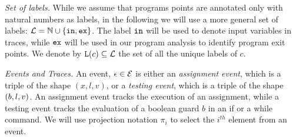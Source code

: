 %

\noindent\emph{Set of labels.} While we assume that programs points are annotated only with natural numbers as labels, in the following we will use a more general set of labels: $\mathcal{L} = \mathbb{N}\cup\{\mathtt{in},\mathtt{ex}\}$. The label $\mathtt{in}$ will be used to denote input variables in traces, while $\mathtt{ex}$ will be used in our program analysis to identify program exit points.
We denote by  $\mathtt{L}(c) \subseteq \mathcal{L}$ the set of all the unique labels of $c$.





\noindent\emph{Events and Traces.} 
An event, $\mathtt{\epsilon} \in \mathcal{E}$ is either an \emph{assignment event}, which is  a triple of the shape $({x}, l,v)$, or a \emph{testing event}, which is a triple of the shape $(b, l, v)$. An assignment event tracks the execution of an assignment, while a testing event tracks the evaluation
of a boolean guard $b$ in an if or a while command.
We will use projection notation $\pi_i$ to select the $i^{th}$ element
from an event.



